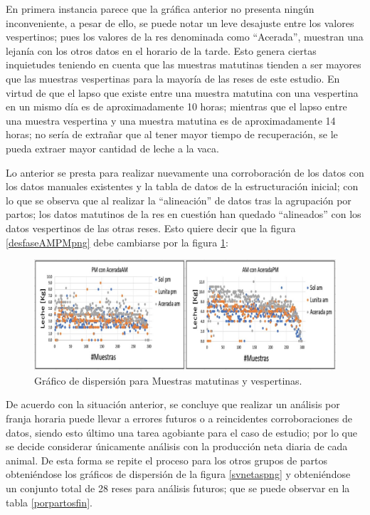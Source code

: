 En primera instancia parece que la gráfica anterior no presenta ningún inconveniente, a pesar de ello, se puede notar un leve desajuste entre los valores vespertinos; pues los valores de la res denominada como ``Acerada'', muestran una lejanía con los otros datos en el horario de la tarde. Esto genera ciertas inquietudes teniendo en cuenta que las muestras matutinas tienden a ser mayores que las muestras vespertinas para la mayoría de las reses de este estudio. En virtud de que el lapso que existe entre una muestra matutina con una vespertina en un mismo día es de aproximadamente 10 horas; mientras que el lapso entre una muestra vespertina y una muestra matutina es de aproximadamente 14 horas; no sería de extrañar que al tener mayor tiempo de recuperación, se le pueda extraer mayor cantidad de leche a la vaca.

Lo anterior se presta para realizar nuevamente una corroboración de los datos con los datos manuales existentes y la tabla de datos de la estructuración inicial; con lo que se observa que al realizar la ``alineación'' de datos tras la agrupación por partos; los datos matutinos de la res en cuestión han quedado ``alineados'' con los datos vespertinos de las otras reses. Esto quiere decir que la figura \ref{desfaseAMPMpng} debe cambiarse por la figura \ref{AMPMsindesfasepng}:


\begin{figure}[H]
	 \begin{center}
	 \includegraphics[scale=0.5835]{img/AMPMsindesfase.jpg}
	 \end{center}
	 \caption{Gráfico de dispersión para Muestras matutinas y vespertinas. \label{AMPMsindesfasepng}}
\end{figure}


De acuerdo con la situación anterior, se concluye que realizar un análisis por franja horaria puede llevar a errores futuros o a reincidentes corroboraciones de datos, siendo esto último una tarea agobiante para el caso de estudio; por lo que se decide considerar únicamente análisis con la producción neta diaria de cada animal. De esta forma se repite el proceso para los otros grupos de partos obteniéndose los gráficos de dispersión de la figura \ref{svnetaspng} y obteniéndose un conjunto total de 28 reses para análisis futuros; que se puede observar en la tabla \ref{porpartosfin}.

